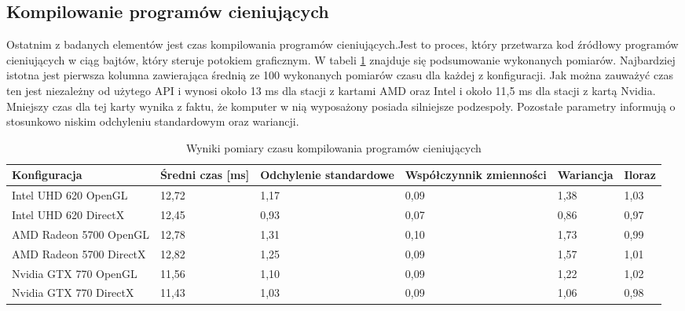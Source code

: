 \documentclass[archive]{mgr}
\begin{document}
\subsection{Kompilowanie programów cieniujących}

Ostatnim z badanych elementów jest czas kompilowania programów cieniujących.Jest to proces, który przetwarza kod źródłowy programów cieniujących w ciąg bajtów, który steruje potokiem graficznym. W tabeli \ref{lab:shadertable} znajduje się podsumowanie wykonanych pomiarów. Najbardziej istotna jest pierwsza kolumna zawierająca średnią ze 100 wykonanych pomiarów czasu dla każdej z konfiguracji. Jak można zauważyć czas ten jest niezależny od użytego API i wynosi około 13 ms dla stacji z kartami AMD oraz Intel i około 11,5 ms dla stacji z kartą Nvidia. Mniejszy czas dla tej karty wynika z faktu, że komputer w nią wyposażony posiada silniejsze podzespoły. Pozostałe parametry informują o stosunkowo niskim odchyleniu standardowym oraz wariancji.

\begin{table}[!h]

    \centering 
    \caption{Wyniki pomiary czasu kompilowania programów cieniujących}
    		\label{lab:shadertable}
    \vspace{2mm} 
\begin{tabular}{|p{2.5cm}|p{2cm}|p{3cm}|p{3cm}|p{2cm}|p{1.5cm}|}
\hline

\textbf{Konfiguracja} &	\textbf{Średni czas [ms]}	&\textbf{Odchylenie standardowe}&\textbf{Współczynnik zmienności}&\textbf{Wariancja}&\textbf{Iloraz}\\ \hline

Intel UHD 620 OpenGL &12,72
&1,17
&0,09
&1,38
&1,03
\\ \hline

Intel UHD 620 DirectX &12,45
&0,93
&0,07
&0,86
&0,97
\\ \hline

AMD Radeon 5700 OpenGL &12,78

&1,31

&0,10

&1,73

&0,99


\\ \hline

AMD Radeon 5700 DirectX &12,82
&1,25
&0,09
&1,57
&1,01

\\ \hline

Nvidia GTX 770 OpenGL &11,56

&1,10

&0,09

&1,22

&1,02

\\ \hline

Nvidia GTX 770 DirectX &11,43

&1,03

&0,09

&1,06

&0,98
\\ \hline

\end{tabular}
\end{table}
\newpage
\end{document}
